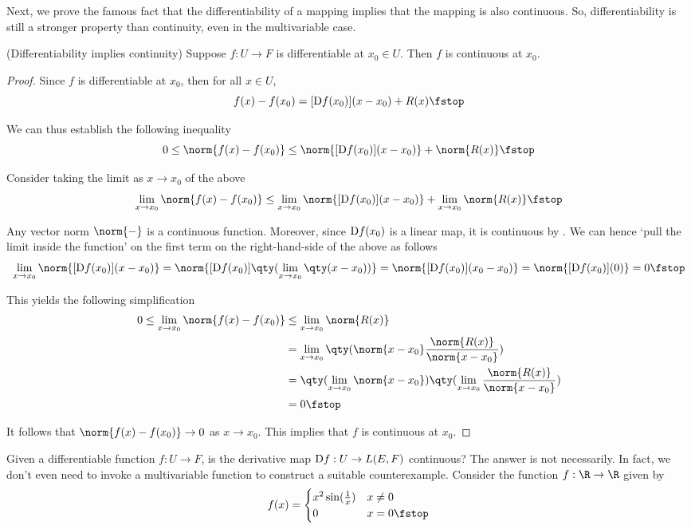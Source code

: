 Next, we prove the famous fact that the differentiability of a mapping implies that the mapping is also continuous. So, differentiability is still a stronger property than continuity, even in the multivariable case.

\begin{theorem}
  (Differentiability implies continuity) Suppose \( f:U\to F \) is differentiable at \( x_0\in U \). Then \( f \) is continuous at \( x_0 \).
\end{theorem}
\begin{proof}
  Since \( f \) is differentiable at \( x_0 \), then for all \( x\in U \),
  \[ f(x)-f(x_0)=[\D f(x_0)](x-x_0)+R(x)\fstop \]

  We can thus establish the following inequality
  \[ 0\leq\norm{f(x)-f(x_0)}\leq\norm{[\D f(x_0)](x-x_0)}+\norm{R(x)}\fstop \]

  Consider taking the limit as \( x\to x_0 \) of the above
  \begin{equation*}
    \lim_{x\to x_0}\norm{f(x)-f(x_0)}\leq \lim_{x\to x_0}\norm{[\D f(x_0)](x-x_0)}+\lim_{x\to x_0}\norm{R(x)}\fstop
  \end{equation*}

  Any vector norm \( \norm{-} \) is a continuous function. Moreover, since \( \text{D} f(x_0) \) is a linear map, it is continuous by . We can hence `pull the limit inside the function' on the first term on the right-hand-side of the above as follows
  \[ \lim_{x\to x_0}\norm{[\D f(x_0)](x-x_0)}=\norm{[\D f(x_0)]\qty(\lim_{x\to x_0}\qty(x-x_0))}=\norm{[\D f(x_0)](x_0-x_0)}=\norm{[\D f(x_0)](0)}=0\fstop \]

  This yields the following simplification
  \begin{align*}
    0\leq \lim_{x\to x_0}\norm{f(x)-f(x_0)}&\leq \lim_{x\to x_0}\norm{R(x)}\\
    &= \lim_{x\to x_0}\qty(\norm{x-x_0}\frac{\norm{R(x)}}{\norm{x-x_0}})\\
    &= \qty(\lim_{x\to x_0}\norm{x-x_0})\qty(\lim_{x\to x_0}\frac{\norm{R(x)}}{\norm{x-x_0}})\\
    &= 0\fstop
  \end{align*}

  It follows that \( \norm{f(x)-f(x_0)}\to 0 \) as \( x\to x_0 \). This implies that \( f \) is continuous at \( x_0\).
\end{proof}

Given a differentiable function \( f:U\to F \), is the derivative map \( \text{D} f:U\to L(E,F) \) continuous? The answer is not necessarily. In fact, we don't even need to invoke a multivariable function to construct a suitable counterexample. Consider the function \( f:\R\to\R \) given by
\[ f(x)=
  \begin{cases}
    x^2\sin(\frac{1}{x}) &x\neq 0\\
    0 &x=0\fstop
  \end{cases}
\]

